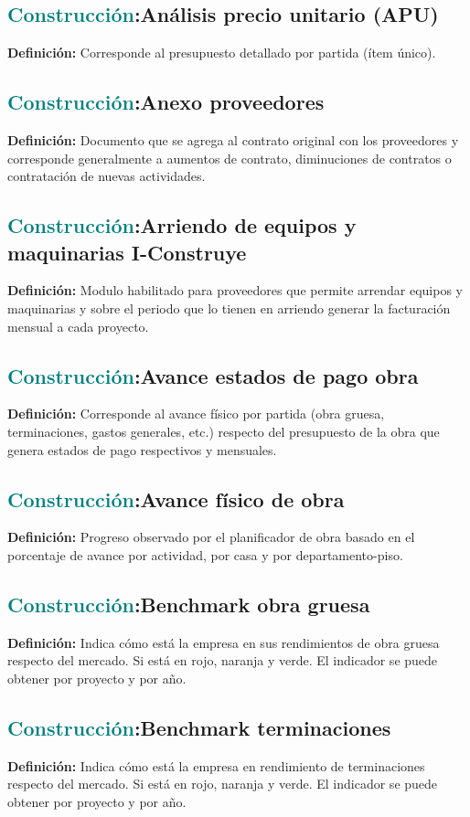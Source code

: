 \documentclass[12pt]{article}
\begin{document}
\subsection{\textcolor{teal}{Construcción}:{Análisis precio unitario (APU)}}
\textbf{Definición:} Corresponde al presupuesto detallado por partida (ítem único).
\subsection{\textcolor{teal}{Construcción}:{Anexo proveedores}}
\textbf{Definición:} Documento que se agrega al contrato original con los proveedores y corresponde generalmente a aumentos de contrato, diminuciones de contratos o contratación de nuevas actividades.
\subsection{\textcolor{teal}{Construcción}:{Arriendo de equipos y maquinarias I-Construye}}
\textbf{Definición:} Modulo habilitado para proveedores que permite arrendar equipos y maquinarias y sobre el periodo que lo tienen en arriendo generar la facturación mensual a cada proyecto.
\subsection{\textcolor{teal}{Construcción}:{Avance estados de pago obra}}
\textbf{Definición:} Corresponde al avance físico por partida (obra gruesa, terminaciones, gastos generales, etc.) respecto del presupuesto de la obra que genera estados de pago respectivos y mensuales.
\subsection{\textcolor{teal}{Construcción}:{Avance físico de obra}}
\textbf{Definición:} Progreso observado por el planificador de obra basado en el porcentaje de avance por actividad, por casa y por departamento-piso.
\subsection{\textcolor{teal}{Construcción}:{Benchmark obra gruesa}}
\textbf{Definición:} Indica cómo está la empresa en sus rendimientos de obra gruesa respecto del mercado. Si está en rojo, naranja y verde. El indicador se puede obtener por proyecto y por año.
\subsection{\textcolor{teal}{Construcción}:{Benchmark terminaciones}}
\textbf{Definición:} Indica cómo está la empresa en rendimiento de terminaciones respecto del mercado. Si está en rojo, naranja y verde. El indicador se puede obtener por proyecto y por año.
\end{document}
